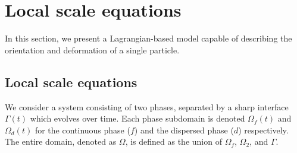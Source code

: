 \section{Local scale equations}

In this section, we present a Lagrangian-based model capable of describing the orientation and deformation of a single particle. 
\label{sec:local_eq_ellipse}

\subsection{Local scale equations}

We consider a system consisting of two phases, separated by a sharp interface $\Gamma(t)$ which evolves over time. 
Each phase subdomain is denoted $\Omega_f(t)$ and $\Omega_d(t)$ for the continuous phase ($f$) and the dispersed phase ($d$) respectively. 
The entire domain, denoted as $\Omega$, is defined as the union of $\Omega_f$, $\Omega_2$, and $\Gamma$.

